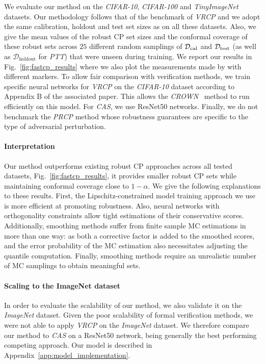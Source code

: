 We evaluate our method on the \textsl{CIFAR-10}, \textsl{CIFAR-100} and \textsl{TinyImageNet} datasets. Our methodology follows that of the benchmark of \emph{VRCP} and we adopt the same calibration, holdout and test set sizes as \citet{vrcp} on all these datasets. Also, we give the mean values of the robust CP set sizes and the conformal coverage of these robust sets across $25$ different random samplings of $\mathcal{D}_\mathrm{cal}$ and $\mathcal{D}_\mathrm{test}$ (as well as $\mathcal{D}_\mathrm{holdout}$ for \emph{PTT}) that were unseen during training. We report our results in Fig.~\ref{fig:fastcp_results} where we also plot the measurements made by \citet{vrcp} with different markers. To allow fair comparison with verification methods, we train specific neural networks for \emph{VRCP} on the \textsl{CIFAR-10} dataset according to Appendix B of the associated paper. This allows the \emph{CROWN}~\cite{zhang2018efficientneuralnetworkrobustness} method to run efficiently on this model. For \emph{CAS}, we use ResNet50 networks. Finally, we do not benchmark the \emph{PRCP} method whose robustness guarantees are specific to the type of adversarial perturbation.

\paragraph{Interpretation} Our method outperforms existing robust CP approaches across all tested datasets, Fig.~\ref{fig:fastcp_results}, it provides smaller robust CP sets while maintaining conformal coverage close to $1-\alpha$. We give the following explanations to these results. First, the Lipschitz-constrained model training approach we use is more efficient at promoting robustness. Also, neural networks with orthogonality constraints allow tight estimations of their conservative scores. Additionally, smoothing methods suffer from finite sample MC estimations in more than one way: as both a corrective factor is added to the smoothed scores, and the error probability of the MC estimation also necessitates adjusting the quantile computation. Finally, smoothing methods require an unrealistic number of MC samplings to obtain meaningful sets.

\paragraph{Scaling to the ImageNet dataset} In order to evaluate the scalability of our method, we also validate it on the \textsl{ImageNet} dataset. Given the poor scalability of formal verification methods, we were not able to apply \emph{VRCP} on the \textsl{ImageNet} dataset. 
We therefore compare our method to \emph{CAS} on a ResNet50 network, being generally the best performing competing approach. %
 Our model is described in Appendix~\ref{app:model_implementation}. 

